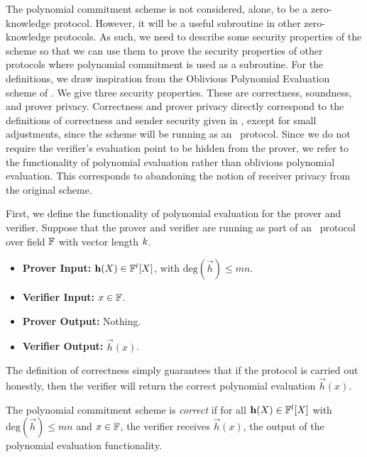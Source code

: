 The polynomial commitment scheme is not considered, alone, to be a zero-knowledge protocol. However, it will be a useful subroutine in other zero-knowledge protocols. As such, we need to describe some security properties of the scheme so that we can use them to prove the security properties of other protocols where polynomial commitment is used as a subroutine. For the definitions, we draw inspiration from the Oblivious Polynomial Evaluation scheme of \cite{NaorP06}. We give three security properties. These are correctness, soundness, and prover privacy. Correctness and prover privacy directly correspond to the definitions of correctness and sender security given in \cite{NaorP06}, except for small adjustments, since the scheme will be running as an \ILC\ protocol. Since we do not require the verifier's evaluation point to be hidden from the prover, we refer to the functionality of polynomial evaluation rather than oblivious polynomial evaluation. This corresponds to abandoning the notion of receiver privacy from the original scheme.

First, we define the functionality of polynomial evaluation for the prover and verifier. Suppose that the prover and verifier are running as part of an \ILC\ protocol over field $\mathbb{F}$ with vector length $k$.

\begin{itemize}
\item \textbf{Prover Input:} $\mathbf{h}(X) \in \mathbb{F}^l[X]$, with $\text{deg}(\vec{h})\leq mn$.
\item \textbf{Verifier Input:} $x \in \mathbb{F}$.
\item \textbf{Prover Output:} Nothing.
\item \textbf{Verifier Output:} $\vec{h}(x)$.
\end{itemize}

The definition of correctness simply guarantees that if the protocol is carried out honestly, then the verifier will return the correct polynomial evaluation $\vec{h}(x)$.

\begin{definition}[Correctness]
The polynomial commitment scheme is \emph{correct} if for all $\mathbf{h}(X) \in \mathbb{F}^l[X]$ with $\text{deg}(\vec{h}) \leq mn$ and $x \in \mathbb{F}$, the verifier receives $\vec{h}(x)$, the output of the polynomial evaluation functionality.
\end{definition}

